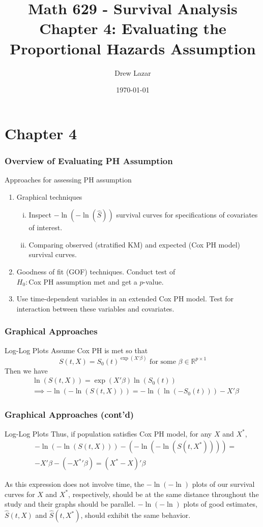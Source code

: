 \documentclass{beamer}
\title{Math 629 - Survival Analysis \\ Chapter 4: Evaluating the Proportional Hazards Assumption}
\author{Drew Lazar}
\institute{Ball State University}
\date{\today}
\theoremstyle{definition}
\begin{document}
\begin{frame}
    \titlepage
\end{frame}



\section{Chapter 4}
\begin{frame}
\frametitle{Overview of Evaluating PH Assumption}
\begin{block}{Approaches for assessing PH assumption}
\begin{enumerate}
\item Graphical techniques
\begin{enumerate}[i.]
\item Inspect $-\ln(-\ln(\hat{S}))$ survival curves for specifications of covariates of interest.
\item Comparing observed (stratified KM) and expected (Cox PH model) survival curves.
\end{enumerate}
\item Goodness of fit (GOF) techniques. Conduct test of $H_0: \text{Cox PH assumption met}$ and get a $p$-value.
\item Use time-dependent variables in an extended Cox PH model. Test for interaction between these variables and covariates.
\end{enumerate}
\end{block}
\end{frame}
\begin{frame}
\frametitle{Graphical Approaches}
\begin{block}{Log-Log Plots}
Assume Cox PH is met so that
\[ S(t,X) = S_0(t)^{\exp(X'\beta)} \text{ for some }  \beta \in \mathbb{R}^{p\times1}
\]
Then we have
\begin{align*}
&\ln( S(t,X)) = \exp(X'\beta)\ln(S_0(t)) \\
&\implies -\ln(-\ln(S(t,X))) = -\ln(\ln(-S_0(t))) - X'\beta
\end{align*}
\end{block}
\end{frame}

\begin{frame}
\frametitle{Graphical Approaches (cont'd)}
\begin{block}{Log-Log Plots}
Thus, if population satisfies Cox PH model, for any $X$ and $X^*$,
\begin{align*}
&-\ln(-\ln(S(t,X)))- (-\ln(-\ln(S(t,X^*)))) = \\
&-X'\beta - (-{X^*}'\beta) =(X^*-X)'\beta
\end{align*}
\end{block}
As this expression does not involve time, the  $-\ln(-\ln)$ plots of our survival curves for $X$ and $X^*$, respectively, should be at the same distance throughout the study and their graphs should be parallel. $-\ln(-\ln)$ plots of good estimates, $\hat{S}(t,X)$ and $\hat{S}(t,X^*)$, should exhibit the same behavior.
\end{frame}
\end{document}

